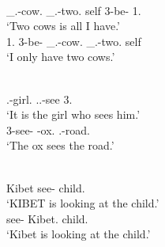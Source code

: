 \begin{exe}\ex\label{TurEmph}
\begin{xlist}
\ex\gll{}    \\
\Non\_{}\neu{}.\pl{}-cow.\acc{} \Non{}\_\neu{}.\pl{}-two.\acc{} self 3-be-\pl{} 1\sg{}.\acc{}\\
\glt `Two cows is all I have.'
\ex\gll{}    \\
1\sg{}.\acc{} 3-be-\pl{} \Non{}\_\neu{}.\pl{}-cow.\nom{}  \Non{}\_\neu{}.\pl{}-two.\nom{} self\\
\glt `I only have two cows.'
\end{xlist} 
\end{exe}

\begin{exe}
\ex \label{MaaEmph}
\begin{xlist}
\ex\gll {}  \\
\fem{}.\sg{}-girl.\acc{} \relativ{}.\fem{}.\sg{}-see 3\sg{}.\acc{}\\
\glt `It is the girl who sees him.'
\ex\gll {}  \\
3\sg{}-see-\prog{} \mas{}\sg{}-ox.\nom{} \fem{}.\sg{}-road.\acc{}\\
\glt `The ox sees the road.'
\end{xlist}
\end{exe}


%

\begin{exe}\ex\label{NanEmph}
\begin{xlist}
\ex\gll {}   \\
Kibet \partic{} see-\ipfv{} child.\acc{}\\
\glt `{KIBET} is looking at the child.'
\ex\gll{}  \\
see-\ipfv{} Kibet.\nom{} child.\acc{}\\
\glt `Kibet is looking at the child.'
\end{xlist} 
\end{exe} 

